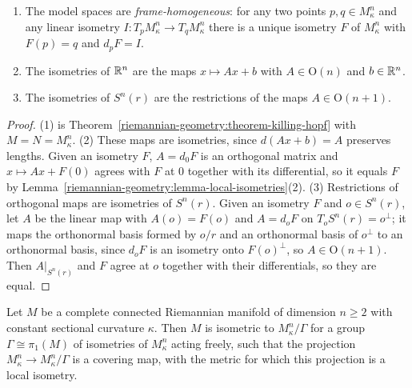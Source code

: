 \begin{corollary}\label{riemannian-geometry:corollary-model-isometries}
\begin{enumerate}
\item The model spaces are \emph{frame-homogeneous}: for any two points $p, q \in M^n_\kappa$ and any linear isometry $I \colon T_pM^n_\kappa \to T_qM^n_\kappa$ there is a
unique isometry $F$ of $M^n_\kappa$ with $F(p) = q$ and $d_pF = I$.
\item The isometries of $\mathbb{R}^n$ are the maps $x \mapsto Ax + b$ with $A \in \mathrm{O}(n)$ and $b \in \mathbb{R}^n$.
\item The isometries of $S^n(r)$ are the restrictions of the maps $A \in \mathrm{O}(n + 1)$.
\end{enumerate}
\end{corollary}

\begin{proof}
(1) is Theorem~\ref{riemannian-geometry:theorem-killing-hopf} with $M = N = M^n_\kappa$. (2) These maps are isometries, since $d(Ax + b) = A$ preserves lengths. Given
an isometry $F$, $A = d_0F$ is an orthogonal matrix and $x \mapsto Ax + F(0)$ agrees with $F$ at $0$ together with its differential, so it equals $F$ by
Lemma~\ref{riemannian-geometry:lemma-local-isometries}(2). (3) Restrictions of orthogonal maps are isometries of $S^n(r)$. Given an isometry $F$ and $o \in S^n(r)$,
let $A$ be the linear map with $A(o) = F(o)$ and $A = d_oF$ on $T_oS^n(r) = o^\perp$; it maps the orthonormal basis formed by $o/r$ and an orthonormal basis of $o^\perp$
to an orthonormal basis, since $d_oF$ is an isometry onto $F(o)^\perp$, so $A \in \mathrm{O}(n + 1)$. Then $A|_{S^n(r)}$ and $F$ agree at $o$ together with their
differentials, so they are equal.
\end{proof}

\begin{corollary}\label{riemannian-geometry:corollary-space-forms}
Let $M$ be a complete connected Riemannian manifold of dimension $n \geq 2$ with constant sectional curvature $\kappa$. Then $M$ is isometric to $M^n_\kappa/\Gamma$ for
a group $\Gamma \cong \pi_1(M)$ of isometries of $M^n_\kappa$ acting freely, such that the projection $M^n_\kappa \to M^n_\kappa/\Gamma$ is a covering map, with the metric for
which this projection is a local isometry.
\end{corollary}

